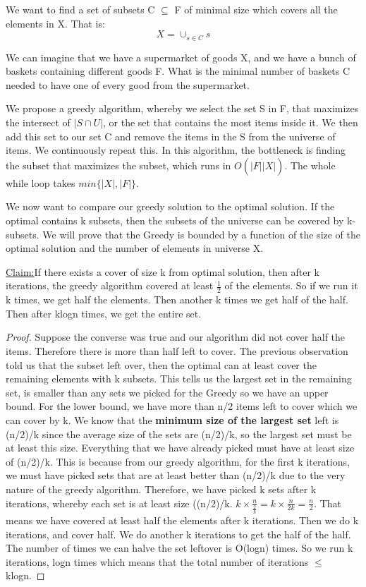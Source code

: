 \documentclass[11pt, oneside]{article}
\theoremstyle{definition}
\newenvironment{claim}[1]{\par\noindent\underline{Claim:}\space#1}{}
\begin{document}
We want to find a set of subsets C $\subseteq$ F of minimal size which covers all the elements in X. That is:
$$
X = \cup_{s \in C}s
$$

We can imagine that we have a supermarket of goods X, and we have a bunch of baskets containing different goods F. What is the minimal number of baskets C needed to have one of every good from the supermarket.

We propose a greedy algorithm, whereby we select the set S in F, that maximizes the intersect of $|S \cap U|$, or the set that contains the most items inside it. We then add this set to our set C and remove the items in the S from the universe of items. We continuously repeat this. In this algorithm, the bottleneck is finding the subset that maximizes the subset, which runs in $O(|F|\dot|X|)$. The whole while loop takes $min\{|X|,|F|\}$.

We now want to compare our greedy solution to the optimal solution. If the optimal contains k subsets, then the subsets of the universe can be covered by k-subsets. We will prove that the Greedy is bounded by a function of the size of the optimal solution and the number of elements in universe X.

\begin{claim}
  If there exists a cover of size k from optimal solution, then after k iterations, the greedy algorithm covered at least $\frac{1}{2}$ of the elements.
\end{claim}
So if we run it k times, we get half the elements. Then another k times we get half of the half. Then after klogn times, we get the entire set.
\begin{proof}
  Suppose the converse was true and our algorithm did not cover half the items. Therefore there is more than half left to cover. The previous observation told us that the subset left over, then the optimal can at least cover the remaining elements with k subsets. This tells us the largest set in the remaining set, is smaller than any sets we picked for the Greedy so we have an upper bound. For the lower bound, we have more than n/2 items left to cover which we can cover by k. We know that the \textbf{minimum size of the largest set} left is (n/2)/k since the average size of the sets are (n/2)/k, so the largest set must be at least this size. Everything that we have already picked must have at least size of (n/2)/k. This is because from our greedy algorithm, for the first k iterations, we must have picked sets that are at least better than (n/2)/k due to the very nature of the greedy algorithm. Therefore, we have picked k sets after k iterations, whereby each set is at least size ((n/2)/k. $k \times \frac{n}{\frac{2}{k}} = k \times \frac{n}{2k} = \frac{n}{2}$. That means we have covered at least half the elements after k iterations. Then we do k iterations, and cover half. We do another k iterations to get the half of the half. The number of times we can halve the set leftover is O(logn) times. So we run k iterations, logn times which means that the total number of iterations $\leq$ klogn.
\end{proof}
\end{document}
